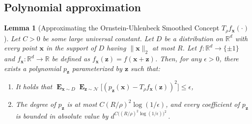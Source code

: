 \documentclass[10pt,a4paper]{article}
\newtheorem{lemma}{Lemma}[section]
\newcommand\twonorm[1]{\|#1\|_2}
\renewcommand\vec[1]{\mathbf{#1}}
\DeclareMathOperator*{\E}{\mathbf{E}}
\newcommand{\R}{\mathbb{R}}
\newcommand{\1}{\Ind}
\newcommand{\x}{\vec x}
\newcommand{\z}{\vec z}
\newcommand{\Gauss}{\mathcal{N}}
\begin{document}
\subsection{Polynomial approximation}
\begin{lemma}[Approximating the Ornstein-Uhlenbeck Smoothed Concept $T_\rho f_{\vec x}(\cdot)$]
    \label{lem:ou_approx_bounded}
    Let $C> 0$ be some large universal constant.
    Let $D$ be a distribution on $\R^d$ with every point $\x$ in the support of $D$ having $\twonorm{\x}$ at most $R$. Let $f:\R^d\to\{\pm 1\}$ and $f_{\x}:\R^d\to\R$ be defined as $f_{\x}(\z)=f(\x+\z)$. Then, for any $\epsilon>0$, there exists a polynomial $p_{\z}$ parameterized by $\z$ such that:
  \begin{enumerate}
            \item It holds that $\E_{\x \sim D}\E_{\z\sim \Gauss}\bigl[(p_{\z}(\x)-T_{\rho}f_{\x}(\z))^2\bigr]\leq \epsilon$,
            \item The degree of $p_{\z}$ is at most $C(R/\rho)^2\log(1/\epsilon)$,
            and  every coefficient of $p_{\z}$ is bounded in absolute value by $d^{C\bigl((R/\rho)^2\log(1/\epsilon)\bigr)^2}$\,. 
    \end{enumerate}
\end{lemma}
\end{document}
